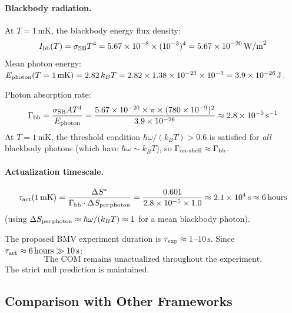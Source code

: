 \documentclass[12pt,a4paper]{article}
\begin{document}
\paragraph{Blackbody radiation.}  At $T=1\,\mathrm{mK}$, the blackbody energy flux density:
\begin{equation}
  I_{\rm bb}(T) = \sigma_{\rm SB}T^4 = 5.67\times10^{-8}\times(10^{-3})^4 = 5.67\times10^{-20}\,\mathrm{W/m}^2
\end{equation}
Mean photon energy: $E_{\rm photon}(T=1\,\mathrm{mK}) = 2.82\,k_BT = 2.82\times1.38\times10^{-23}\times10^{-3} = 3.9\times10^{-26}\,\mathrm{J}$.

Photon absorption rate:
\begin{equation}
  \Gamma_{\rm bb} = \frac{\sigma_{\rm SB}A T^4}{E_{\rm photon}} = \frac{5.67\times10^{-20}\times\pi\times(780\times10^{-9})^2}{3.9\times10^{-26}} \approx 2.8\times10^{-5}\,\mathrm{s}^{-1}
\end{equation}
At $T=1\,\mathrm{mK}$, the threshold condition $\hbar\omega/(k_BT)>0.6$ is satisfied for \emph{all} blackbody photons (which have $\hbar\omega\sim k_BT$), so $\Gamma_{\rm on\text{-}shell}\approx\Gamma_{\rm bb}$.

\paragraph{Actualization timescale.}
\begin{equation}
  \tau_{\rm act}(1\,\mathrm{mK}) = \frac{\Delta S^*}{\Gamma_{\rm bb}\cdot\Delta S_{\rm per\,photon}} = \frac{0.601}{2.8\times10^{-5}\times1.0} \approx 2.1\times10^4\,\mathrm{s} \approx 6\,\mathrm{hours}
  \label{eq:tau_bmv}
\end{equation}
(using $\Delta S_{\rm per\,photon}\approx\hbar\omega/(k_BT)\approx1$ for a mean blackbody photon).

The proposed BMV experiment duration is $\tau_{\rm exp}\approx1$--$10\,\mathrm{s}$.  Since $\tau_{\rm act}\approx6\,\mathrm{hours}\gg10\,\mathrm{s}$:
\begin{equation}
  \text{The COM remains unactualized throughout the experiment.}
\end{equation}
The strict null prediction is maintained.

\subsection{Comparison with Other Frameworks}
\end{document}
